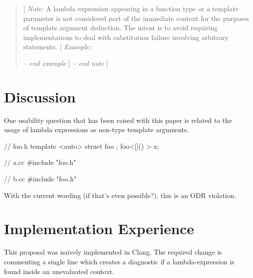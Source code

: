 \documentclass[11pt]{article}
\begin{document}
\begin{enumerate}
  \begin{quote}
    [ \textit{Note:} A lambda expression appearing in a function type or a
    template parameter is not considered part of the immediate context for the
    purposes of template argument deduction. The intent is to avoid requiring
    implementations to deal with substitution failure involving arbitrary
    statements. [ \textit{Example:}
    \textit{-- end example} ]
    \textit{-- end note} ]
  \end{quote}

\end{enumerate}


\section{Discussion}
One usability question that has been raised with this paper is related to the
usage of lambda expressions as non-type template arguments.

\begin{cpp}
// foo.h
template <auto> struct foo { };
foo<[]() {}> x;

// a.cc
#include "foo.h"

// b.cc
#include "foo.h"
\end{cpp}

With the current wording (if that's even possible?), this is an ODR violation.


\section{Implementation Experience}
This proposal was naively implemented in Clang. The required change is commenting
a single line which creates a diagnostic if a lambda-expression is found inside an
unevaluated context.
\end{document}
